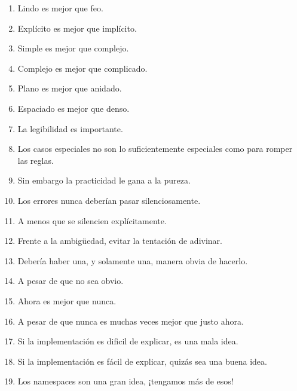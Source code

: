 \begin{enumerate}
	\item Lindo es mejor que feo.
	\item Explícito es mejor que implícito.
	\item Simple es mejor que complejo.
	\item Complejo es mejor que complicado.
	\item Plano es mejor que anidado.
	\item Espaciado es mejor que denso.
	\item La legibilidad es importante.
	\item Los casos especiales no son lo suficientemente especiales como para romper las reglas.
	\item Sin embargo la practicidad le gana a la pureza.
	\item Los errores nunca deberían pasar silenciosamente.
	\item A menos que se silencien explícitamente.
	\item Frente a la ambigüedad, evitar la tentación de adivinar.
	\item Debería haber una, y solamente una, manera obvia de hacerlo.
	\item A pesar de que no sea obvio.
	\item Ahora es mejor que nunca.
	\item A pesar de que nunca es muchas veces mejor que justo ahora.
	\item Si la implementación es dificil de explicar, es una mala idea.
	\item Si la implementación es fácil de explicar, quizás sea una buena idea.
	\item Los namespaces son una gran idea, ¡tengamos más de esos!
\end{enumerate}

